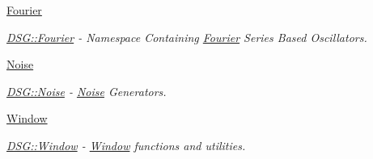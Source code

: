 \begin{DoxyCompactItemize}
 \hyperlink{namespace_d_s_g_1_1_fourier}{Fourier}
\begin{DoxyCompactList}\small\item\em \hyperlink{namespace_d_s_g_1_1_fourier}{D\+S\+G\+::\+Fourier} -\/ Namespace Containing \hyperlink{namespace_d_s_g_1_1_fourier}{Fourier} Series Based Oscillators. \end{DoxyCompactList}\item 
 \hyperlink{namespace_d_s_g_1_1_noise}{Noise}
\begin{DoxyCompactList}\small\item\em \hyperlink{namespace_d_s_g_1_1_noise}{D\+S\+G\+::\+Noise} -\/ \hyperlink{namespace_d_s_g_1_1_noise}{Noise} Generators. \end{DoxyCompactList}\item 
 \hyperlink{namespace_d_s_g_1_1_window}{Window}
\begin{DoxyCompactList}\small\item\em \hyperlink{namespace_d_s_g_1_1_window}{D\+S\+G\+::\+Window} -\/ \hyperlink{namespace_d_s_g_1_1_window}{Window} functions and utilities. \end{DoxyCompactList}\end{DoxyCompactItemize}
